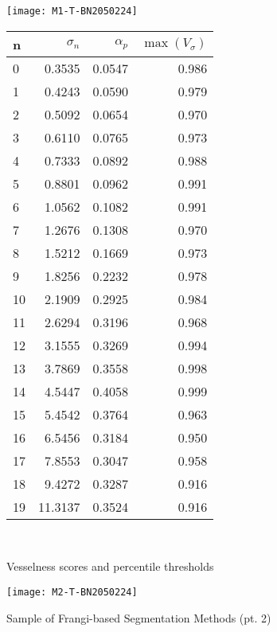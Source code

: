 \begin{figure}
	\begin{minipage}[tp]{0.5\textwidth}
		\texttt{[image: M1-T-BN2050224]}
	\end{minipage}
	\quad
	\begin{minipage}[tp]{0.35\textwidth}
		\begin{tabular}{l|r|r|r}
			n  & $\sigma_n$  &  $\alpha_p$  &  $\max(V_\sigma)$ \\
			\hline
			0  &   0.3535 &  0.0547 &  0.986\\
			1  &   0.4243 &  0.0590 &  0.979\\
			2  &   0.5092 &  0.0654 &  0.970\\
			3  &   0.6110 &  0.0765 &  0.973\\
			4  &   0.7333 &  0.0892 &  0.988\\
			5  &   0.8801 &  0.0962 &  0.991\\
			6  &   1.0562 &  0.1082 &  0.991\\
			7  &   1.2676 &  0.1308 &  0.970\\
			8  &   1.5212 &  0.1669 &  0.973\\
			9  &   1.8256 &  0.2232 &  0.978\\
			10 &   2.1909 &  0.2925 &  0.984\\
			11 &   2.6294 &  0.3196 &  0.968\\
			12 &   3.1555 &  0.3269 &  0.994\\
			13 &   3.7869 &  0.3558 &  0.998\\
			14 &   4.5447 &  0.4058 &  0.999\\
			15 &   5.4542 &  0.3764 &  0.963\\
			16 &   6.5456 &  0.3184 &  0.950\\
			17 &   7.8553 &  0.3047 &  0.958\\
			18 &   9.4272 &  0.3287 &  0.916\\
			19 &  11.3137 &  0.3524 &  0.916\\
		\end{tabular} \\
	\end{minipage}
	\caption{Vesselness scores and percentile thresholds}
\end{figure}

\begin{figure}[p] \centering
	\texttt{[image: M2-T-BN2050224]}
	\caption{Sample of Frangi-based Segmentation Methods (pt. 2)}
\end{figure}

